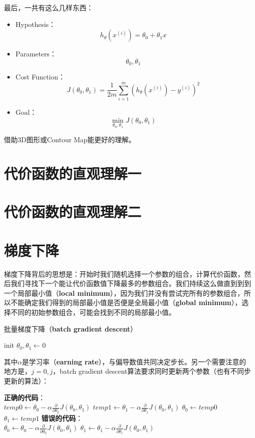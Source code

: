 \documentclass[../main.tex]{subfiles}
\begin{document}
最后，一共有这么几样东西：
\begin{itemize}
    \item Hypothesis：\[h_θ(x^{(i)}) = θ_0+θ_1x\]
    \item Parameters：\[θ_0,θ_1\]
    \item Cost Function：\[J(θ_0,θ_1) = \frac{1}{2m}\sum\limits_{i=1}^m ( h_{θ}(x^{(i)})-y^{(i)} )^{2}\]
    \item Goal：\[\min\limits_{θ_0, θ_1}J(θ_0, θ_1)\]
\end{itemize}


借助3D图形或Contour Map能更好的理解。

\section{代价函数的直观理解一}
\section{代价函数的直观理解二}

\section{梯度下降}
梯度下降背后的思想是：开始时我们随机选择一个参数的组合，计算代价函数，然后我们寻找下一个能让代价函数值下降最多的参数组合。我们持续这么做直到到到一个局部最小值（\textbf{local minimum}），因为我们并没有尝试完所有的参数组合，所以不能确定我们得到的局部最小值是否便是全局最小值（\textbf{global minimum}），选择不同的初始参数组合，可能会找到不同的局部最小值。
\\\begin{algorithm}[H]
    \caption{批量梯度下降（\textbf{batch gradient descent}）}
    init \(θ_0, θ_1← 0\)\;
\end{algorithm}
其中\(α\)是学习率（\textbf{earning rate}），与偏导数值共同决定步长。另一个需要注意的地方是，\(j=0, j\)，batch gradient descent算法要求同时更新两个参数（也有不同步更新的算法）：\\
\begin{algorithm}[H]
    \textbf{正确的代码}：\\
    \(temp0 ← θ_0 - α\frac{∂}{∂θ_0}J(θ_0,θ_1)\)\;
    \(temp1 ← θ_1 - α\frac{∂}{∂θ_1}J(θ_0,θ_1)\)\;
    \(θ_0 ← temp0\)\;
    \(θ_1 ← temp1\)\;
    {\bfseries\color{red}错误的代码}：\\
    \(θ_0 ← θ_0 - α\frac{∂}{∂θ_0}J(θ_0,θ_1)\)\;
    \(θ_1 ← θ_1 - α\frac{∂}{∂θ_1}J(θ_0,θ_1)\)\;
\end{algorithm}
\end{document}

